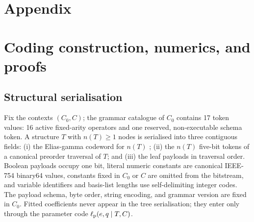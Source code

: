 \appendix
\renewcommand{\thesection}{\Alph{section}}
\section*{Appendix}
\makeatletter
\renewcommand*{\theHsection}{appendix.\Alph{section}}
\renewcommand*{\theHequation}{appendix.\Alph{section}.\arabic{equation}}
\renewcommand*{\theHtable}{appendix.\Alph{section}.\arabic{table}}
\renewcommand*{\theHfigure}{appendix.\Alph{section}.\arabic{figure}}
\def\theHdefinition{appendix.\Alph{section}.\arabic{definition}}
\def\theHtheorem{appendix.\Alph{section}.\arabic{theorem}}
\def\theHproposition{appendix.\Alph{section}.\arabic{proposition}}
\def\theHcorollary{appendix.\Alph{section}.\arabic{corollary}}
\def\theHlemma{appendix.\Alph{section}.\arabic{lemma}}
\def\theHremark{appendix.\Alph{section}.\arabic{remark}}
\makeatother
\renewcommand{\theequation}{\thesection.\arabic{equation}}
\renewcommand{\thetable}{\thesection.\arabic{table}}
\renewcommand{\thefigure}{\thesection.\arabic{figure}}
\renewcommand{\thedefinition}{\thesection.\arabic{definition}}
\renewcommand{\thetheorem}{\thesection.\arabic{theorem}}
\renewcommand{\theproposition}{\thesection.\arabic{proposition}}
\renewcommand{\thecorollary}{\thesection.\arabic{corollary}}
\renewcommand{\thelemma}{\thesection.\arabic{lemma}}
\renewcommand{\theremark}{\thesection.\arabic{remark}}

\section{Coding construction, numerics, and proofs}\label{app:code}

\subsection{Structural serialisation}\label{app:structural}

Fix the contexts \((C_0,C)\); the grammar catalogue of \(C_0\) contains 17 token values: 16 active fixed-arity operators and one reserved, non-executable schema token. A structure \(T\) with \(n(T)\ge1\) nodes is serialised into three contiguous fields: (i) the Elias-gamma codeword for \(n(T)\) \citep{elias1975codes}; (ii) the \(n(T)\) five-bit tokens of a canonical preorder traversal of \(T\); and (iii) the leaf payloads in traversal order. Boolean payloads occupy one bit, literal numeric constants are canonical IEEE-754 binary64 values, constants fixed in \(C_0\) or \(C\) are omitted from the bitstream, and variable identifiers and basis-list lengths use self-delimiting integer codes. The payload schema, byte order, string encoding, and grammar version are fixed in \(C_0\). Fitted coefficients never appear in the tree serialisation; they enter only through the parameter code \(\ell_{\rm p}(e,q\mid T,C)\).

